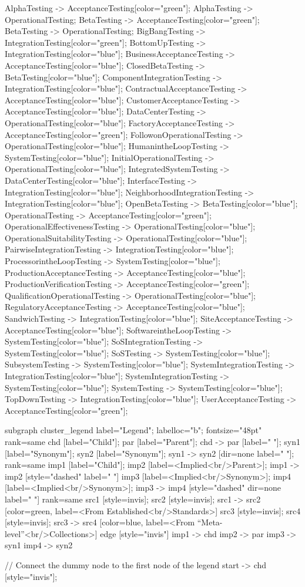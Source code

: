 \documentclass{article}
\begin{document}
{AlphaTesting -> AcceptanceTesting[color="green"];
AlphaTesting -> OperationalTesting;
BetaTesting -> AcceptanceTesting[color="green"];
BetaTesting -> OperationalTesting;
BigBangTesting -> IntegrationTesting[color="green"];
BottomUpTesting -> IntegrationTesting[color="blue"];
BusinessAcceptanceTesting -> AcceptanceTesting[color="blue"];
ClosedBetaTesting -> BetaTesting[color="blue"];
ComponentIntegrationTesting -> IntegrationTesting[color="blue"];
ContractualAcceptanceTesting -> AcceptanceTesting[color="blue"];
CustomerAcceptanceTesting -> AcceptanceTesting[color="blue"];
DataCenterTesting -> OperationalTesting[color="blue"];
FactoryAcceptanceTesting -> AcceptanceTesting[color="green"];
FollowonOperationalTesting -> OperationalTesting[color="blue"];
HumanintheLoopTesting -> SystemTesting[color="blue"];
InitialOperationalTesting -> OperationalTesting[color="blue"];
IntegratedSystemTesting -> DataCenterTesting[color="blue"];
InterfaceTesting -> IntegrationTesting[color="blue"];
NeighborhoodIntegrationTesting -> IntegrationTesting[color="blue"];
OpenBetaTesting -> BetaTesting[color="blue"];
OperationalTesting -> AcceptanceTesting[color="green"];
OperationalEffectivenessTesting -> OperationalTesting[color="blue"];
OperationalSuitabilityTesting -> OperationalTesting[color="blue"];
PairwiseIntegrationTesting -> IntegrationTesting[color="blue"];
ProcessorintheLoopTesting -> SystemTesting[color="blue"];
ProductionAcceptanceTesting -> AcceptanceTesting[color="blue"];
ProductionVerificationTesting -> AcceptanceTesting[color="green"];
QualificationOperationalTesting -> OperationalTesting[color="blue"];
RegulatoryAcceptanceTesting -> AcceptanceTesting[color="blue"];
SandwichTesting -> IntegrationTesting[color="blue"];
SiteAcceptanceTesting -> AcceptanceTesting[color="blue"];
SoftwareintheLoopTesting -> SystemTesting[color="blue"];
SoSIntegrationTesting -> SystemTesting[color="blue"];
SoSTesting -> SystemTesting[color="blue"];
SubsystemTesting -> SystemTesting[color="blue"];
SystemIntegrationTesting -> IntegrationTesting[color="blue"];
SystemIntegrationTesting -> SystemTesting[color="blue"];
SystemTesting -> SystemTesting[color="blue"];
TopDownTesting -> IntegrationTesting[color="blue"];
UserAcceptanceTesting -> AcceptanceTesting[color="green"];

subgraph cluster_legend {
    label="Legend";
    labelloc="b";
    fontsize="48pt"
    {
        rank=same
        chd [label="Child"];
        par [label="Parent"];
        chd -> par [label="                "];
        syn1 [label="Synonym"];
        syn2 [label="Synonym"];
        syn1 -> syn2 [dir=none label="                "];
    }
    {
        rank=same
        imp1 [label="Child"];
        imp2 [label=<Implied<br/>Parent>];
        imp1 -> imp2 [style="dashed" label="                "]
        imp3 [label=<Implied<br/>Synonym>];
        imp4 [label=<Implied<br/>Synonym>];
        imp3 -> imp4 [style="dashed" dir=none label="                "]
    }
{
rank=same
src1 [style=invis];
src2 [style=invis];
src1 -> src2 [color=green, label=<From Established<br/>Standards>]
src3 [style=invis];
src4 [style=invis];
src3 -> src4 [color=blue, label=<From ``Meta-level''<br/>Collections>]
}
    edge [style="invis"]
    imp1 -> chd
    imp2 -> par
    imp3 -> syn1
    imp4 -> syn2
}

// Connect the dummy node to the first node of the legend
start -> chd [style="invis"];
}
\end{document}
